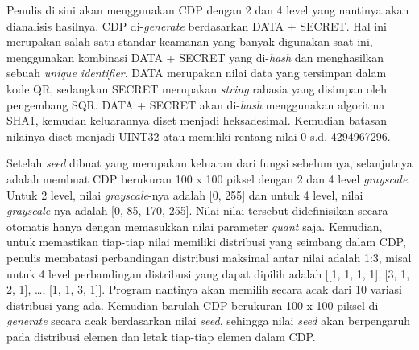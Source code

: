 Penulis di sini akan menggunakan CDP dengan 2 dan 4 level yang nantinya akan dianalisis hasilnya. CDP di-\emph{generate} berdasarkan DATA + SECRET. Hal ini
merupakan salah satu standar keamanan yang banyak digunakan saat ini, menggunakan kombinasi DATA + SECRET yang di-\emph{hash} dan menghasilkan sebuah
\emph{unique identifier}. DATA merupakan nilai data yang tersimpan dalam kode QR, sedangkan SECRET merupakan \emph{string} rahasia yang disimpan oleh
pengembang SQR. DATA + SECRET akan di-\emph{hash} menggunakan algoritma SHA1, kemudan keluarannya diset menjadi heksadesimal. Kemudian batasan nilainya diset
menjadi UINT32 atau memiliki rentang nilai 0 s.d. 4294967296.

Setelah \emph{seed} dibuat yang merupakan keluaran dari fungsi sebelumnya, selanjutnya adalah membuat CDP berukuran 100 x 100 piksel dengan 2 dan 4 level
\emph{grayscale}. Untuk 2 level, nilai \emph{grayscale}-nya adalah [0, 255] dan untuk 4 level, nilai \emph{grayscale}-nya adalah [0, 85, 170, 255]. Nilai-nilai
tersebut didefinisikan secara otomatis hanya dengan memasukkan nilai parameter \emph{quant} saja. Kemudian, untuk memastikan tiap-tiap nilai memiliki
distribusi yang seimbang dalam CDP, penulis membatasi perbandingan distribusi maksimal antar nilai adalah 1:3, misal untuk 4 level perbandingan distribusi yang
dapat dipilih adalah [[1, 1, 1, 1], [3, 1, 2, 1], …, [1, 1, 3, 1]]. Program nantinya akan memilih secara acak dari 10 variasi distribusi yang ada. Kemudian
barulah CDP berukuran 100 x 100 piksel di-\emph{generate} secara acak berdasarkan nilai \emph{seed}, sehingga nilai \emph{seed} akan berpengaruh pada
distribusi elemen dan letak tiap-tiap elemen dalam CDP.

